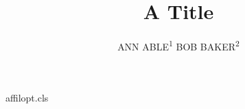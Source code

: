 \begin{filecontents*}[overwrite]{affilopt.cls}
\def\author#1{\gdef\@author{#1}}
\newcommand\affil[2][]{{\reset@font\small\unskip,\ \textsuperscript{#1}#2\endgraf}}
\def\maketitle{\par{\Large\@title\par}{\noindent\@author\par}}
\end{filecontents*}
\documentclass{affilopt}

\title{A Title}
\author{ANN ABLE\textsuperscript{1}  BOB BAKER\textsuperscript{2}\footnotemark {}}
\maketitle
{}
Body.

